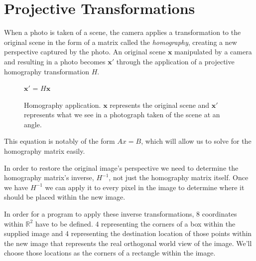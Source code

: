 \documentclass{article}
\begin{document}
\clearpage

\section{Projective Transformations}
When a photo is taken of a scene, the camera applies a transformation to the original scene in the form of a matrix called the \textit{homography}, creating a new perspective captured by the photo. An original scene \( \textbf{x} \) manipulated by a camera and resulting in a photo becomes \( \textbf{x}' \) through the application of a projective homography transformation \( H \).

\begin{figure}[h]
    \centering
    \( \textbf{x}' \) = \( H\textbf{x} \)
    \caption{Homography application. \( \textbf{x} \) represents the original scene and \( \textbf{x}' \) represents what we see in a photograph taken of the scene at an angle.}
\end{figure}

This equation is notably of the form \( Ax = B \), which will allow us to solve for the homography matrix easily\footnotemark.

In order to restore the original image's perspective we need to determine the homography matrix's inverse, \( H^{-1} \), not just the homography matrix itself. Once we have \( H^{-1} \) we can apply it to every pixel in the image to determine where it should be placed within the new image.

In order for a program to apply these inverse transformations, 8 coordinates within $\mathbb{R}^2$ have to be defined. 4 representing the corners of a box within the supplied image and 4 representing the destination location of those points within the new image that represents the real orthogonal world view of the image. We'll choose those locations as the corners of a rectangle within the image.
\end{document}
